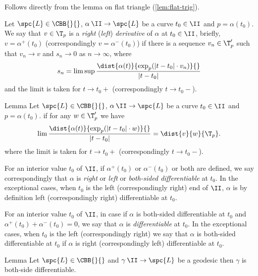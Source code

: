 Follows directly from the lemma on flat triangle (\ref{lem:flat-trig}).
\qeds






















Let 
$\spc{L}\in\CBB{}{}$,
$\alpha\:\II\to \spc{L}$ be a curve
$t_0\in \II$
and $p=\alpha(t_0)$.
We say that $v\in\T_p$ is a \emph{right} (\emph{left}) \emph{derivative} of $\alpha$ at $t_0\in\II$, 
briefly, $v=\alpha^+(t_0)$ (correspondingly $v=\alpha^-(t_0)$)
if there is a sequence $v_n\in\T_p'$ such that $v_n\to v$
and $s_n\to 0$ as $n\to\infty$, where
\[s_n=\limsup\frac{\dist{\alpha(t)}{\exp_p(|t-t_0|\cdot v_n)}{}}{|t-t_0|}\]
and the limit is taken for $t\to t_0+$ (correspondingly $t\to t_0-$).

\begin{thm}{Lemma}
Let
$\spc{L}\in\CBB{}{}$,
$\alpha\:\II\to \spc{L}$ be a curve
$t_0\in \II$
and $p=\alpha(t_0)$.
if for any $w\in\T_p'$ we have
\[\lim\frac{\dist{\alpha(t)}{\exp_p(|t-t_0|\cdot w)}{}}{|t-t_0|}
=
\dist{v}{w}{\T_p}.\]
where the limit is taken for $t\to t_0+$ (correspondingly $t\to t_0-$).
\end{thm}


For an interior value $t_0$ of $\II$, 
if $\alpha^+(t_0)$ or $\alpha^-(t_0)$ or both are defined,
we say correspondingly that  $\alpha$ is \emph{right} or \emph{left} or \emph{both-sided differentiable} at $t_0$.
In the exceptional cases, when $t_0$ is the left (correspondingly right) end of $\II$, $\alpha$ is by definition left (correspondingly right) differentiable at $t_0$.

For an interior value $t_0$ of $\II$,
in case if $\alpha$ is both-sided differentiable at $t_0$ and $\alpha^+(t_0)+\alpha^-(t_0)=0$, we say that $\alpha$ is \emph{differentiable} at $t_0$.
In the exceptional cases, when $t_0$ is the left (correspondingly right)
we say that $\alpha$ is both-sided differentiable at $t_0$ if $\alpha$ is right (correspondingly left) differentiable at $t_0$.

\begin{thm}{Lemma}
Let $\spc{L}\in\CBB{}{}$ and $\gamma\:\II\to\spc{L}$ be a geodesic then $\gamma$ is both-side differentiable.
\end{thm}





















